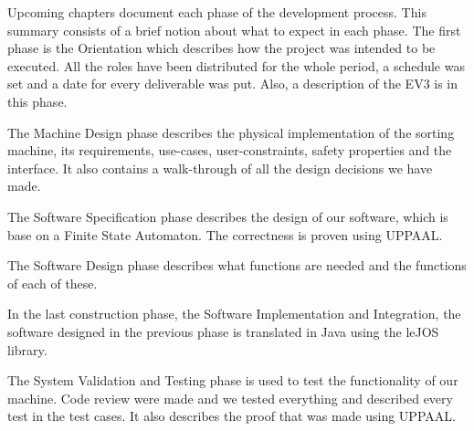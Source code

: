 Upcoming chapters document each phase of the development process. This summary consists of a brief notion about what to expect in each phase. The first phase is the Orientation which describes how the project was intended to be executed. All the roles have been distributed for the whole period, a schedule was set and a date for every deliverable was put. Also, a description of the EV3 is in this phase.

The Machine Design phase describes the physical implementation of the sorting machine, its requirements, use-cases, user-constraints, safety properties and the interface. It also contains a walk-through of all the design decisions we have made.

The Software Specification phase describes the design of our software, which is base on a Finite State Automaton. The correctness is proven using UPPAAL.

The Software Design phase describes what functions are needed and the functions of each of these.

In the last construction phase, the Software Implementation and Integration, the software designed in the previous phase is translated in Java using the leJOS library.

The System Validation and Testing phase is used to test the functionality of our machine. Code review were made and we tested everything and described every test in the test cases. It also describes the proof that was made using UPPAAL.